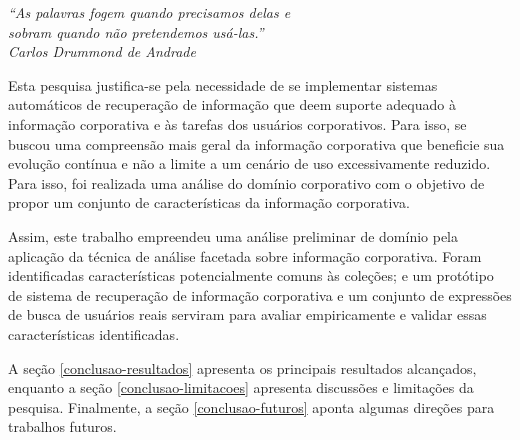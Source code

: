 
	\begin{flushright}
		\textit{``As palavras fogem quando precisamos delas e 
		\\sobram quando não pretendemos usá-las.''\\Carlos Drummond de Andrade}
	\end{flushright}

Esta pesquisa justifica-se pela necessidade de se implementar sistemas automáticos de recuperação de informação que deem suporte adequado à informação corporativa e às tarefas dos usuários corporativos. Para isso, se buscou uma compreensão mais geral da informação corporativa que beneficie sua evolução contínua e não a limite a um cenário de uso excessivamente reduzido. Para isso, foi realizada uma análise do domínio corporativo com o objetivo de propor um conjunto de características da informação corporativa.

Assim, este trabalho empreendeu uma análise preliminar de domínio pela aplicação da técnica de análise facetada sobre informação corporativa. Foram identificadas características potencialmente comuns às coleções; e um protótipo de sistema de recuperação de informação corporativa e um conjunto de expressões de busca de usuários reais serviram para avaliar empiricamente e validar essas características identificadas.



A seção \ref{conclusao-resultados} apresenta os principais resultados alcançados, enquanto a seção \ref{conclusao-limitacoes} apresenta discussões e limitações da pesquisa. Finalmente, a seção \ref{conclusao-futuros} aponta algumas direções para trabalhos futuros.




